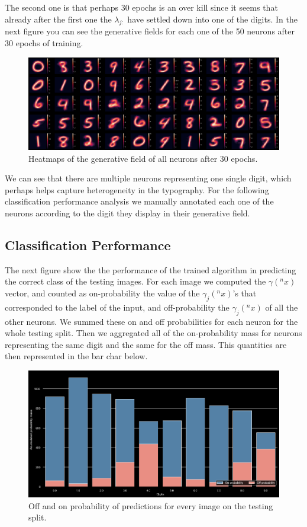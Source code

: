 \documentclass{article}
\begin{document}
The second one is that perhaps 30 epochs is an over kill since it seems that already after the first one the \(\lambda_{j:}\) have settled down into one of the digits. In the next figure you can see the generative fields for each one of the 50 neurons after 30 epochs of training.

\begin{figure}[h]
    \includegraphics[width=\textwidth]{img/output_43_1.png}
    \caption{Heatmaps of the generative field of all neurons after 30 epochs. \label{gen_fileds}}
\end{figure}

We can see that there are multiple neurons representing one single digit, which perhaps helps capture heterogeneity in the typography. For the following classification performance analysis we manually annotated each one of the neurons according to the digit they display in their generative field. 

\subsection{Classification Performance}
The next figure show the the performance of the trained algorithm in predicting the correct class of the testing images. For each image we computed the \(\gamma(^nx)\) vector, and counted as on-probability the value of the \(\gamma_j(^nx)\)'s that corresponded to the label of the input, and off-probability the  \(\gamma_j(^nx)\) of all the other neurons. We summed these on and off probabilities for each neuron for the whole testing split. Then we aggregated all of the on-probability mass for neurons representing the same digit and the same for the off mass. This quantities are then represented in the bar char below.

\begin{figure}[h]
    \includegraphics[width=\textwidth]{img/output_47_0.png}
    \caption{Off and on probability of predictions for every image on the testing split. \label{on-off}}
\end{figure}
\end{document}
